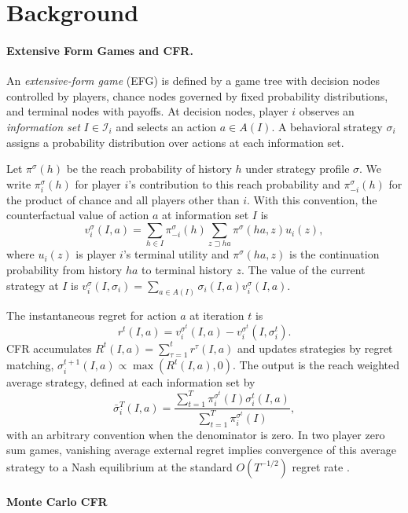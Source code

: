 \documentclass[11pt]{article}
\begin{document}
\section{Background}

\paragraph{Extensive Form Games and CFR.}

An \textit{extensive-form game} (EFG) is defined by a game tree with decision nodes controlled by players, chance nodes governed by fixed probability distributions, and terminal nodes with payoffs. At decision nodes, player $i$ observes an \textit{information set} $I \in \mathcal{I}_i$ and selects an action $a \in A(I)$. A behavioral strategy $\sigma_i$ assigns a probability distribution over actions at each information set.

Let $\pi^\sigma(h)$ be the reach probability of history $h$ under strategy profile $\sigma$. We write $\pi_i^\sigma(h)$ for player $i$'s contribution to this reach probability and $\pi_{-i}^\sigma(h)$ for the product of chance and all players other than $i$. With this convention, the counterfactual value of action $a$ at information set $I$ is
\[
v_i^\sigma(I,a)=\sum_{h\in I}\pi_{-i}^\sigma(h)\sum_{z\sqsupset ha}\pi^\sigma(ha,z)u_i(z),
\]
where $u_i(z)$ is player $i$'s terminal utility and $\pi^\sigma(ha,z)$ is the continuation probability from history $ha$ to terminal history $z$. The value of the current strategy at $I$ is $v_i^\sigma(I,\sigma_i)=\sum_{a\in A(I)}\sigma_i(I,a)v_i^\sigma(I,a)$.

The instantaneous regret for action $a$ at iteration $t$ is
\[
r^t(I,a)=v_i^{\sigma^t}(I,a)-v_i^{\sigma^t}(I,\sigma_i^t).
\]
CFR accumulates $R^t(I,a)=\sum_{\tau=1}^t r^\tau(I,a)$ and updates strategies by regret matching, $\sigma_i^{t+1}(I,a)\propto \max(R^t(I,a),0)$. The output is the reach weighted average strategy, defined at each information set by
\[
\bar\sigma_i^T(I,a)=
\frac{\sum_{t=1}^T \pi_i^{\sigma^t}(I)\sigma_i^t(I,a)}
{\sum_{t=1}^T \pi_i^{\sigma^t}(I)},
\]
with an arbitrary convention when the denominator is zero. In two player zero sum games, vanishing average external regret implies convergence of this average strategy to a Nash equilibrium at the standard $O(T^{-1/2})$ regret rate \citep{zinkevich2007regret}.

\paragraph{Monte Carlo CFR}
\label{sec:mccfr-background}
\end{document}
